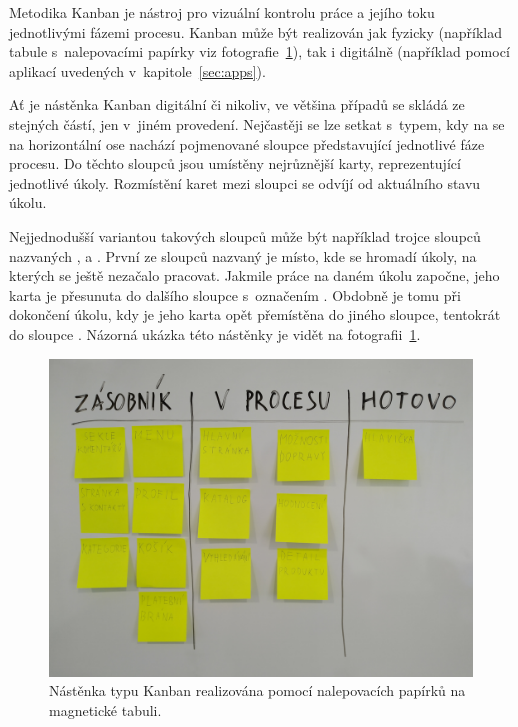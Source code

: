 Metodika Kanban je nástroj pro vizuální kontrolu práce a jejího toku jednotlivými fázemi procesu. Kanban může být realizován jak fyzicky (například tabule s~nalepovacími papírky viz fotografie~\ref{img:kanban-whiteboard}), tak i digitálně (například pomocí aplikací uvedených v~kapitole~\ref{sec:apps}). 

Ať je nástěnka Kanban digitální či nikoliv, ve většina případů se skládá ze stejných částí, jen v~jiném provedení. Nejčastěji se lze setkat s~typem, kdy na se na horizontální ose nachází pojmenované sloupce představující jednotlivé fáze procesu. Do těchto sloupců jsou umístěny nejrůznější karty, reprezentující jednotlivé úkoly. Rozmístění karet mezi sloupci se odvíjí od aktuálního stavu úkolu.

Nejjednodušší variantou takových sloupců může být například trojce sloupců nazvaných ,  a . První ze sloupců nazvaný  je místo, kde se hromadí úkoly, na kterých se ještě nezačalo pracovat. Jakmile práce na daném úkolu započne, jeho karta je přesunuta do dalšího sloupce s~označením . Obdobně je tomu při dokončení úkolu, kdy je jeho karta opět přemístěna do jiného sloupce, tentokrát do sloupce . Názorná ukázka této nástěnky je vidět na fotografii~\ref{img:kanban-whiteboard}.

\begin{figure}[H]
	\centering
	\includegraphics[width=\textwidth]{obrazky-figures/kanban-sticky-note}
	\caption{Nástěnka typu Kanban realizována pomocí nalepovacích papírků na magnetické tabuli.}
	\label{img:kanban-whiteboard}
\end{figure}


